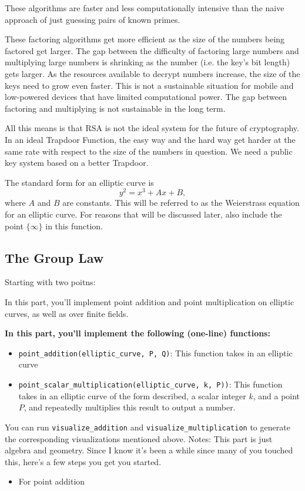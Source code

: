 \documentclass{article}
\begin{document}
These algorithms are faster and less computationally intensive than the naive approach of just guessing pairs of known primes.

These factoring algorithms get more efficient as the size of the numbers being factored get larger. The gap between the difficulty of factoring large numbers and multiplying large numbers is shrinking as the number (i.e. the key's bit length) gets larger. As the resources available to decrypt numbers increase, the size of the keys need to grow even faster. This is not a sustainable situation for mobile and low-powered devices that have limited computational power. The gap between factoring and multiplying is not sustainable in the long term.

All this means is that RSA is not the ideal system for the future of cryptography. In an ideal Trapdoor Function, the easy way and the hard way get harder at the same rate with respect to the size of the numbers in question. We need a public key system based on a better Trapdoor.



The standard form for an elliptic curve is $$y^{2} = x^{3} + Ax + B,$$ where $A$ and $B$ are constants.  This will be referred to as the Weierstrass
equation for an elliptic curve. For reasons that will be discussed later, also include the point $\{\infty\}$ in this function.

\subsection*{The Group Law}
    Starting with two poitns: 



\begin{tcolorbox}
    In this part, you'll implement point addition and point multiplication on elliptic curves, as well as over finite fields.

    
    \textbf{In this part, you'll implement the following (one-line) functions:}
    \begin{itemize}
        \item \lstinline{point_addition(elliptic_curve, P, Q)}: This function takes in an elliptic curve 
        \item \lstinline{point_scalar_multiplication(elliptic_curve, k, P))}: This function takes in an elliptic curve of the form described, a scalar integer $k$, and a point $P$, and repeatedly multiplies this result to output a number.
    \end{itemize}
    You can run \lstinline{visualize_addition} and \lstinline{visualize_multiplication} to generate the corresponding visualizations mentioned above. 
    Notes: This part is just algebra and geometry. Since I know it's been a while since many of you touched this, here's a few steps you get you started.
    \begin{itemize}
        \item For point addition
    \end{itemize}
    
\end{tcolorbox}
\end{document}
